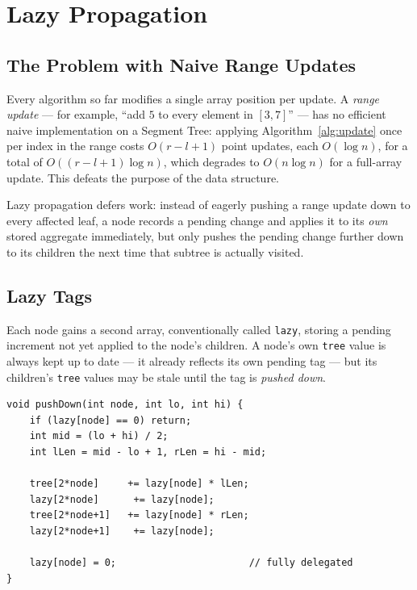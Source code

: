 \documentclass[
  11pt,
  a4paper,
  twoside=false,
  numbers=noenddot,
  headings=big,
  parskip=half,
  toc=bibliography,
  toc=listof,
  bibliography=totoc
]{scrreprt}
\newcounter{example}[chapter]
\newcommand{\Oh}[1]{O\!\left(#1\right)}
\begin{document}
\chapter{Lazy Propagation}
\label{ch:lazy}

\section{The Problem with Naive Range Updates}
Every algorithm so far modifies a single array position per update. A \emph{range update} --- for example, ``add $5$ to every element in $[3,7]$'' --- has no efficient naive implementation on a Segment Tree: applying Algorithm~\ref{alg:update} once per index in the range costs $\Oh{r-l+1}$ point updates, each $\Oh{\log n}$, for a total of $\Oh{(r-l+1)\log n}$, which degrades to $\Oh{n\log n}$ for a full-array update. This defeats the purpose of the data structure.

\begin{keyidea}
Lazy propagation defers work: instead of eagerly pushing a range update down to every affected leaf, a node records a pending change and applies it to its \emph{own} stored aggregate immediately, but only pushes the pending change further down to its children the next time that subtree is actually visited\cite{cpalgorithms}.
\end{keyidea}

\section{Lazy Tags}
Each node gains a second array, conventionally called \texttt{lazy}, storing a pending increment not yet applied to the node's children. A node's own \texttt{tree} value is always kept up to date --- it already reflects its own pending tag --- but its children's \texttt{tree} values may be stale until the tag is \emph{pushed down}.

\begin{lstlisting}[style=cpp, caption={Pushing a pending tag down to both children before recursing into either one.}, label={alg:pushdown}]
void pushDown(int node, int lo, int hi) {
    if (lazy[node] == 0) return;
    int mid = (lo + hi) / 2;
    int lLen = mid - lo + 1, rLen = hi - mid;

    tree[2*node]     += lazy[node] * lLen;
    lazy[2*node]      += lazy[node];
    tree[2*node+1]   += lazy[node] * rLen;
    lazy[2*node+1]    += lazy[node];

    lazy[node] = 0;                       // fully delegated
}
\end{lstlisting}
\end{document}
